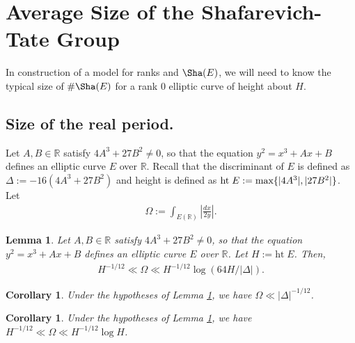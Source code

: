 \documentclass[12pt,reqno]{amsart}
\newtheorem{lemma}[thm]{Lemma}
\newtheorem{cor}[thm]{Corollary}
\numberwithin{equation}{section}
\def\R{{\mathbb R}}
\begin{document}
\section{Average Size of the Shafarevich-Tate Group}

In construction of a model for ranks and $\Sha(E)$, we will need to know the typical size of $\# \Sha(E)$ for a rank $0$ elliptic curve of height about $H$.

\subsection{Size of the real period.}

Let $A, B \in \R$ satisfy $4A^3 + 27B^2 \neq 0$, so that the equation $y^2 = x^3 + Ax+ B$ defines an elliptic curve $E$ over $\R$. Recall that the discriminant of $E$ is defined as $\Delta:= -16(4A^3 + 27B^2)$ and height is defined as $\text{ht} \; E := \text{\rm max}\{|4A^3|, |27B^2|\}$. Let
\begin{align*}
\Omega:= \int_{E(\R)} \left|\frac{dx}{2y}\right|.
\end{align*}

\begin{lemma}\label{l:relation}
Let $A, B \in \R$ satisfy $4A^3 + 27B^2 \neq 0$, so that the equation $y^2 = x^3 + Ax+ B$ defines an elliptic curve $E$ over $\R$. Let $H:= \text{ht} \; E$. Then,
\begin{align*}
H^{-1/12} \ll \Omega \ll H^{-1/12} \log(64H/|\Delta|).
\end{align*}
\end{lemma}

\begin{cor}
Under the hypotheses of Lemma \ref{l:relation}, we have $\Omega \ll |\Delta|^{-1/12}$.
\end{cor}

\begin{cor}\label{c:relation}
Under the hypotheses of Lemma \ref{l:relation}, we have $H^{-1/12} \ll \Omega \ll H^{-1/12} \log H$.
\end{cor}
\end{document}
